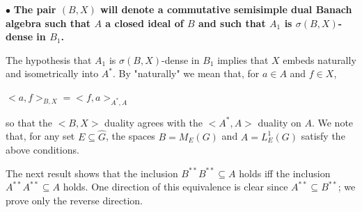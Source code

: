 \documentclass[12pt, twoside, leqno]{article}
\theoremstyle{definition}
\theoremstyle{definition}
\numberwithin{equation}{section}
\begin{document}
$\bullet$ \textbf{The pair $ (B,X) $ will denote a commutative semisimple dual Banach algebra such that $ A $ a closed ideal of $ B $ and such that $ A_{1} $ is $ \sigma(B,X) $-dense in $ B_{1} $.}\vspace{2mm} 

The hypothesis that $ A_{1} $ is $ \sigma(B,X) $-dense in $ B_{1} $ implies that $ X $ embeds naturally and isometrically into $ A^{*} $. By "naturally" we mean that, for $ a\in A $ and $ f\in X $,\vspace{3mm} 

$ <a,f>_{B,X}=<f,a>_{A^{*},A} $\vspace{3mm}

\noindent so that the $ <B,X> $ duality agrees with the $ <A^{*},A> $ duality on $ A $. We note that, for any set $E\subseteq \hat{G}$, the spaces $B=M_{E}(G)$ and $A=L^{1}_{E}(G)$ satisfy the above conditions. \vspace{2mm}

The next result shows that the inclusion $ B^{**}B^{**}\subseteq A $ holds iff the inclusion $ A^{**}A^{**}\subseteq A $ holds. One direction of this equivalence is clear since $ A^{**}\subseteq B^{**} $; we prove only the reverse direction.\vspace{2mm}
\end{document}
